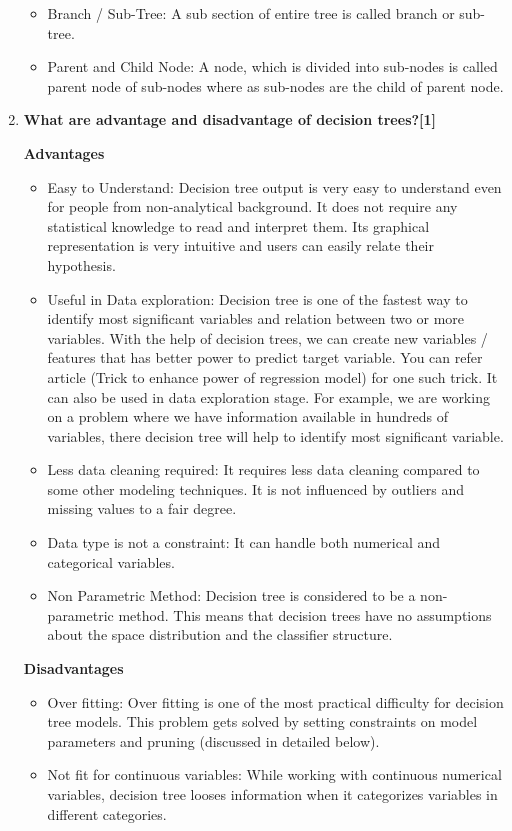 \begin{enumerate}
\begin{itemize}
\item Branch / Sub-Tree: A sub section of entire tree is called branch or sub-tree.

\item Parent and Child Node: A node, which is divided into sub-nodes is called parent node of sub-nodes where as sub-nodes are the child of parent node.
\end{itemize}

\item{\textbf{\color{blue} What are advantage and disadvantage of decision trees?[1]}}

\textbf{Advantages}
\begin{itemize}
\item Easy to Understand: Decision tree output is very easy to understand even for people from non-analytical background. It does not require any statistical knowledge to read and interpret them. Its graphical representation is very intuitive and users can easily relate their hypothesis.

\item Useful in Data exploration: Decision tree is one of the fastest way to identify most significant variables and relation between two or more variables. With the help of decision trees, we can create new variables / features that has better power to predict target variable. You can refer article (Trick to enhance power of regression model) for one such trick.  It can also be used in data exploration stage. For example, we are working on a problem where we have information available in hundreds of variables, there decision tree will help to identify most significant variable.

\item Less data cleaning required: It requires less data cleaning compared to some other modeling techniques. It is not influenced by outliers and missing values to a fair degree.

\item Data type is not a constraint: It can handle both numerical and categorical variables.

\item Non Parametric Method: Decision tree is considered to be a non-parametric method. This means that decision trees have no assumptions about the space distribution and the classifier structure.
\end{itemize}

\textbf{Disadvantages}
\begin{itemize}
\item Over fitting: Over fitting is one of the most practical difficulty for decision tree models. This problem gets solved by setting constraints on model parameters and pruning (discussed in detailed below).
\item Not fit for continuous variables: While working with continuous numerical variables, decision tree looses information when it categorizes variables in different categories.
\end{itemize}


\end{enumerate}
